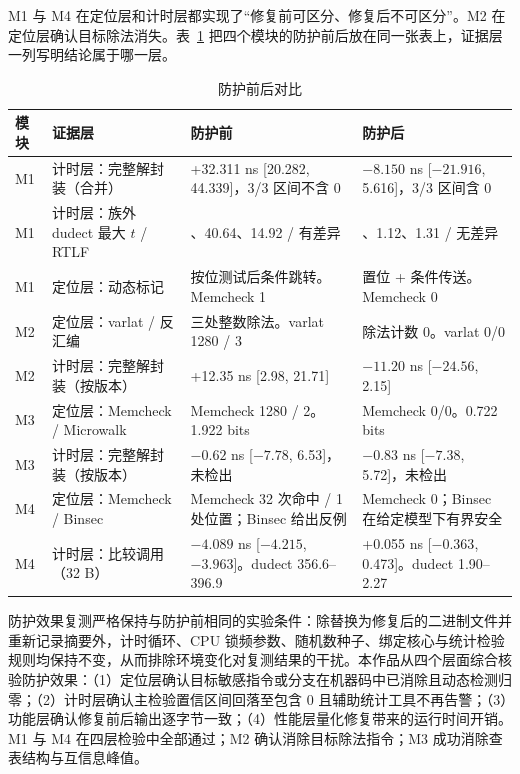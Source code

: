 M1 与 M4 在定位层和计时层都实现了“修复前可区分、修复后不可区分”。M2 在定位层确认目标除法消失。表~\ref{tab:beforeafter} 把四个模块的防护前后放在同一张表上，证据层一列写明结论属于哪一层。%

\begin{table}[H]
\centering
\caption{防护前后对比}
\label{tab:beforeafter}
{\small
\begin{tabularx}{\textwidth}{|>{\raggedright\arraybackslash}p{1.2cm}|>{\raggedright\arraybackslash}p{3.5cm}|>{\raggedright\arraybackslash}p{5.2cm}|>{\raggedright\arraybackslash}X|}
\hline
模块 & 证据层 & 防护前 & 防护后 \\
\hline
M1 & 计时层：完整解封装（合并） & +32.311 ns [20.282, 44.339]，3/3 区间不含 0 & $-8.150$ ns [$-21.916$, 5.616]，3/3 区间含 0 \\
\hline
M1 & 计时层：族外 dudect 最大 $t$ / RTLF & 26.41、40.64、14.92 / 有差异 & 1.15、1.12、1.31 / 无差异 \\
\hline
M1 & 定位层：动态标记 & 按位测试后条件跳转。Memcheck 1 & 置位 + 条件传送。Memcheck 0 \\
\hline
M2 & 定位层：varlat / 反汇编 & 三处整数除法。varlat 1280 / 3 & 除法计数 0。varlat 0/0 \\
\hline
M2 & 计时层：完整解封装（按版本） & +12.35 ns [2.98, 21.71] & $-11.20$ ns [$-24.56$, 2.15] \\
\hline
M3 & 定位层：Memcheck / Microwalk & Memcheck 1280 / 2。1.922 bits & Memcheck 0/0。0.722 bits \\
\hline
M3 & 计时层：完整解封装（按版本） & $-0.62$ ns [$-7.78$, 6.53]，未检出 & $-0.83$ ns [$-7.38$, 5.72]，未检出 \\
\hline
M4 & 定位层：Memcheck / Binsec & Memcheck 32 次命中 / 1 处位置；Binsec 给出反例 & Memcheck 0；Binsec 在给定模型下有界安全 \\
\hline
M4 & 计时层：比较调用（32 B） & $-4.089$ ns [$-4.215$, $-3.963$]。dudect 356.6--396.9 & +0.055 ns [$-0.363$, 0.473]。dudect 1.90--2.27 \\
\hline
\end{tabularx}
\par{}
}
\end{table}

防护效果复测严格保持与防护前相同的实验条件：除替换为修复后的二进制文件并重新记录摘要外，计时循环、CPU 锁频参数、随机数种子、绑定核心与统计检验规则均保持不变，从而排除环境变化对复测结果的干扰。本作品从四个层面综合核验防护效果：（1）定位层确认目标敏感指令或分支在机器码中已消除且动态检测归零；（2）计时层确认主检验置信区间回落至包含 0 且辅助统计工具不再告警；（3）功能层确认修复前后输出逐字节一致；（4）性能层量化修复带来的运行时间开销。M1 与 M4 在四层检验中全部通过；M2 确认消除目标除法指令；M3 成功消除查表结构与互信息峰值。

